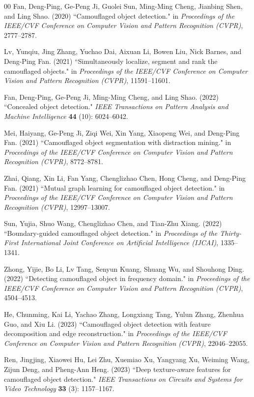 \documentclass[3p,times,procedia]{elsarticle}
\begin{document}
\begin{thebibliography}{00}
{F}an, Deng-Ping, Ge-Peng Ji, Guolei Sun, Ming-Ming Cheng, Jianbing Shen, and Ling Shao. (2020) ``Camouflaged object detection." in {\it Proceedings of the IEEE/CVF Conference on Computer Vision and Pattern Recognition (CVPR)}, 2777--2787.

{L}v, Yunqiu, Jing Zhang, Yuchao Dai, Aixuan Li, Bowen Liu, Nick Barnes, and Deng-Ping Fan. (2021) ``Simultaneously localize, segment and rank the camouflaged objects." in {\it Proceedings of the IEEE/CVF Conference on Computer Vision and Pattern Recognition (CVPR)}, 11591--11601.

{F}an, Deng-Ping, Ge-Peng Ji, Ming-Ming Cheng, and Ling Shao. (2022) ``Concealed object detection." {\it IEEE Transactions on Pattern Analysis and Machine Intelligence} {\bf 44} (10): 6024--6042.

{M}ei, Haiyang, Ge-Peng Ji, Ziqi Wei, Xin Yang, Xiaopeng Wei, and Deng-Ping Fan. (2021) ``Camouflaged object segmentation with distraction mining." in {\it Proceedings of the IEEE/CVF Conference on Computer Vision and Pattern Recognition (CVPR)}, 8772--8781.

{Z}hai, Qiang, Xin Li, Fan Yang, Chenglizhao Chen, Hong Cheng, and Deng-Ping Fan. (2021) ``Mutual graph learning for camouflaged object detection." in {\it Proceedings of the IEEE/CVF Conference on Computer Vision and Pattern Recognition (CVPR)}, 12997--13007.

{S}un, Yujia, Shuo Wang, Chenglizhao Chen, and Tian-Zhu Xiang. (2022) ``Boundary-guided camouflaged object detection." in {\it Proceedings of the Thirty-First International Joint Conference on Artificial Intelligence (IJCAI)}, 1335--1341.

{Z}hong, Yijie, Bo Li, Lv Tang, Senyun Kuang, Shuang Wu, and Shouhong Ding. (2022) ``Detecting camouflaged object in frequency domain." in {\it Proceedings of the IEEE/CVF Conference on Computer Vision and Pattern Recognition (CVPR)}, 4504--4513.

{H}e, Chunming, Kai Li, Yachao Zhang, Longxiang Tang, Yulun Zhang, Zhenhua Guo, and Xiu Li. (2023) ``Camouflaged object detection with feature decomposition and edge reconstruction." in {\it Proceedings of the IEEE/CVF Conference on Computer Vision and Pattern Recognition (CVPR)}, 22046--22055.

{R}en, Jingjing, Xiaowei Hu, Lei Zhu, Xuemiao Xu, Yangyang Xu, Weiming Wang, Zijun Deng, and Pheng-Ann Heng. (2023) ``Deep texture-aware features for camouflaged object detection." {\it IEEE Transactions on Circuits and Systems for Video Technology} {\bf 33} (3): 1157--1167.


\end{thebibliography}
\end{document}
